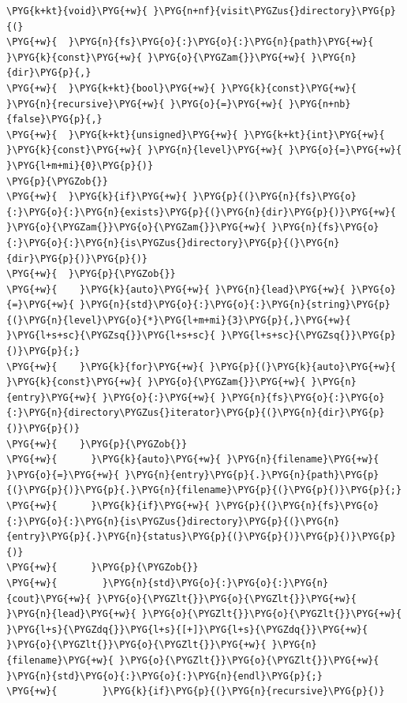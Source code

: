 \begin{itemize}
\begin{codeblockbg}
\begin{Verbatim}[commandchars=\\\{\},breaklines=true,breakanywhere=true,fontsize=\codefont,xleftmargin=17bp]
\PYG{k+kt}{void}\PYG{+w}{ }\PYG{n+nf}{visit\PYGZus{}directory}\PYG{p}{(}
\PYG{+w}{  }\PYG{n}{fs}\PYG{o}{:}\PYG{o}{:}\PYG{n}{path}\PYG{+w}{ }\PYG{k}{const}\PYG{+w}{ }\PYG{o}{\PYGZam{}}\PYG{+w}{ }\PYG{n}{dir}\PYG{p}{,}
\PYG{+w}{  }\PYG{k+kt}{bool}\PYG{+w}{ }\PYG{k}{const}\PYG{+w}{ }\PYG{n}{recursive}\PYG{+w}{ }\PYG{o}{=}\PYG{+w}{ }\PYG{n+nb}{false}\PYG{p}{,}
\PYG{+w}{  }\PYG{k+kt}{unsigned}\PYG{+w}{ }\PYG{k+kt}{int}\PYG{+w}{ }\PYG{k}{const}\PYG{+w}{ }\PYG{n}{level}\PYG{+w}{ }\PYG{o}{=}\PYG{+w}{ }\PYG{l+m+mi}{0}\PYG{p}{)}
\PYG{p}{\PYGZob{}}
\PYG{+w}{  }\PYG{k}{if}\PYG{+w}{ }\PYG{p}{(}\PYG{n}{fs}\PYG{o}{:}\PYG{o}{:}\PYG{n}{exists}\PYG{p}{(}\PYG{n}{dir}\PYG{p}{)}\PYG{+w}{ }\PYG{o}{\PYGZam{}}\PYG{o}{\PYGZam{}}\PYG{+w}{ }\PYG{n}{fs}\PYG{o}{:}\PYG{o}{:}\PYG{n}{is\PYGZus{}directory}\PYG{p}{(}\PYG{n}{dir}\PYG{p}{)}\PYG{p}{)}
\PYG{+w}{  }\PYG{p}{\PYGZob{}}
\PYG{+w}{    }\PYG{k}{auto}\PYG{+w}{ }\PYG{n}{lead}\PYG{+w}{ }\PYG{o}{=}\PYG{+w}{ }\PYG{n}{std}\PYG{o}{:}\PYG{o}{:}\PYG{n}{string}\PYG{p}{(}\PYG{n}{level}\PYG{o}{*}\PYG{l+m+mi}{3}\PYG{p}{,}\PYG{+w}{ }\PYG{l+s+sc}{\PYGZsq{}}\PYG{l+s+sc}{ }\PYG{l+s+sc}{\PYGZsq{}}\PYG{p}{)}\PYG{p}{;}
\PYG{+w}{    }\PYG{k}{for}\PYG{+w}{ }\PYG{p}{(}\PYG{k}{auto}\PYG{+w}{ }\PYG{k}{const}\PYG{+w}{ }\PYG{o}{\PYGZam{}}\PYG{+w}{ }\PYG{n}{entry}\PYG{+w}{ }\PYG{o}{:}\PYG{+w}{ }\PYG{n}{fs}\PYG{o}{:}\PYG{o}{:}\PYG{n}{directory\PYGZus{}iterator}\PYG{p}{(}\PYG{n}{dir}\PYG{p}{)}\PYG{p}{)}
\PYG{+w}{    }\PYG{p}{\PYGZob{}}
\PYG{+w}{      }\PYG{k}{auto}\PYG{+w}{ }\PYG{n}{filename}\PYG{+w}{ }\PYG{o}{=}\PYG{+w}{ }\PYG{n}{entry}\PYG{p}{.}\PYG{n}{path}\PYG{p}{(}\PYG{p}{)}\PYG{p}{.}\PYG{n}{filename}\PYG{p}{(}\PYG{p}{)}\PYG{p}{;}
\PYG{+w}{      }\PYG{k}{if}\PYG{+w}{ }\PYG{p}{(}\PYG{n}{fs}\PYG{o}{:}\PYG{o}{:}\PYG{n}{is\PYGZus{}directory}\PYG{p}{(}\PYG{n}{entry}\PYG{p}{.}\PYG{n}{status}\PYG{p}{(}\PYG{p}{)}\PYG{p}{)}\PYG{p}{)}
\PYG{+w}{      }\PYG{p}{\PYGZob{}}
\PYG{+w}{        }\PYG{n}{std}\PYG{o}{:}\PYG{o}{:}\PYG{n}{cout}\PYG{+w}{ }\PYG{o}{\PYGZlt{}}\PYG{o}{\PYGZlt{}}\PYG{+w}{ }\PYG{n}{lead}\PYG{+w}{ }\PYG{o}{\PYGZlt{}}\PYG{o}{\PYGZlt{}}\PYG{+w}{ }\PYG{l+s}{\PYGZdq{}}\PYG{l+s}{[+]}\PYG{l+s}{\PYGZdq{}}\PYG{+w}{ }\PYG{o}{\PYGZlt{}}\PYG{o}{\PYGZlt{}}\PYG{+w}{ }\PYG{n}{filename}\PYG{+w}{ }\PYG{o}{\PYGZlt{}}\PYG{o}{\PYGZlt{}}\PYG{+w}{ }\PYG{n}{std}\PYG{o}{:}\PYG{o}{:}\PYG{n}{endl}\PYG{p}{;}
\PYG{+w}{        }\PYG{k}{if}\PYG{p}{(}\PYG{n}{recursive}\PYG{p}{)}

\end{Verbatim}
\end{codeblockbg}
\end{itemize}
